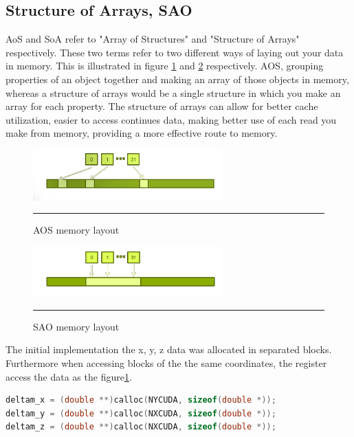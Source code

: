 \subsection{Structure of Arrays, SAO}

AoS and SoA refer to "Array of Structures" and "Structure of Arrays" respectively. These two terms refer to two different ways of laying out your data in memory. This is illustrated in figure \ref{fig:aos} and \ref{fig:sao} respectively. AOS, grouping properties of an object together and making an array of those objects in memory, whereas a structure of arrays would be a single structure in which you make an array for each property. The structure of arrays can allow for better cache utilization, easier to access continues data, making better use of each read you make from memory, providing a more effective route to memory. 

\begin{figure}[htbp]
	\centering
		\includegraphics[width=0.65\textwidth]{Figures/aos.png}
		\rule{35em}{0.2pt}
	\caption[Array of structures (AOS)]{AOS memory layout }
	\label{fig:aos}
\end{figure}


\begin{figure}[htbp]
	\centering
		\includegraphics[width=0.65\textwidth]{Figures/soa.png}
		\rule{35em}{0.2pt}
	\caption[Structure of Arrays (SAO)]{SAO memory layout}
	\label{fig:sao}
\end{figure}

The initial implementation the  x, y, z data was allocated in separated blocks. Furthermore when accessing blocks of the the same coordinates, the register access the data as the figure\ref{fig:aos}.

\begin{lstlisting}[language=C++, caption={AOS implementation}]
deltam_x = (double **)calloc(NYCUDA, sizeof(double *));
deltam_y = (double **)calloc(NXCUDA, sizeof(double *));
deltam_z = (double **)calloc(NXCUDA, sizeof(double *));
\end{lstlisting}

